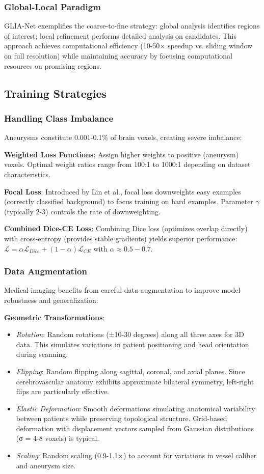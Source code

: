 \documentclass[conference]{IEEEtran}
\begin{document}
\subsubsection{Global-Local Paradigm}
GLIA-Net exemplifies the coarse-to-fine strategy: global analysis identifies regions of interest; local refinement performs detailed analysis on candidates. This approach achieves computational efficiency (10-50× speedup vs. sliding window on full resolution) while maintaining accuracy by focusing computational resources on promising regions.

\subsection{Training Strategies}

\subsubsection{Handling Class Imbalance}
Aneurysms constitute 0.001-0.1\% of brain voxels, creating severe imbalance:

\textbf{Weighted Loss Functions}: Assign higher weights to positive (aneurysm) voxels. Optimal weight ratios range from 100:1 to 1000:1 depending on dataset characteristics.

\textbf{Focal Loss}: Introduced by Lin et al., focal loss downweights easy examples (correctly classified background) to focus training on hard examples. Parameter $\gamma$ (typically 2-3) controls the rate of downweighting.

\textbf{Combined Dice-CE Loss}: Combining Dice loss (optimizes overlap directly) with cross-entropy (provides stable gradients) yields superior performance: $\mathcal{L} = \alpha \mathcal{L}_{Dice} + (1-\alpha) \mathcal{L}_{CE}$ with $\alpha \approx 0.5-0.7$.

\subsubsection{Data Augmentation}
Medical imaging benefits from careful data augmentation to improve model robustness and generalization:

\textbf{Geometric Transformations}: 
\begin{itemize}
    \item \textit{Rotation}: Random rotations (±10-30 degrees) along all three axes for 3D data. This simulates variations in patient positioning and head orientation during scanning.
    \item \textit{Flipping}: Random flipping along sagittal, coronal, and axial planes. Since cerebrovascular anatomy exhibits approximate bilateral symmetry, left-right flips are particularly effective.
    \item \textit{Elastic Deformation}: Smooth deformations simulating anatomical variability between patients while preserving topological structure. Grid-based deformation with displacement vectors sampled from Gaussian distributions (σ = 4-8 voxels) is typical.
    \item \textit{Scaling}: Random scaling (0.9-1.1×) to account for variations in vessel caliber and aneurysm size.
\end{itemize}
\end{document}
